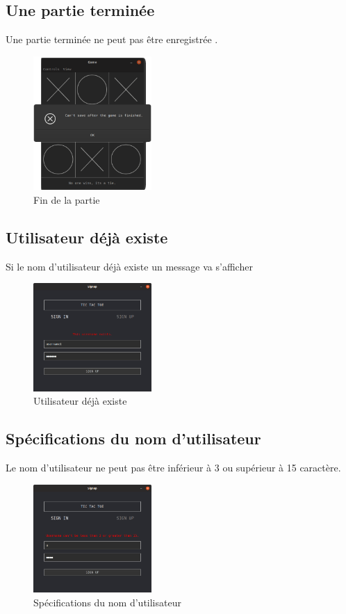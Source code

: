 \subsection{Une partie terminée }
Une partie terminée ne peut pas être enregistrée .

\begin{figure}[H]
	\centering
	\includegraphics[width=0.4\textwidth]{cannot save if game ended.PNG}
	  \caption{Fin de la partie}
	\label{fig:Fin de la partie}
\end{figure}
\clearpage
\subsection{Utilisateur déjà existe  }
Si le nom d’utilisateur déjà existe un message va s’afficher

\begin{figure}[H]
	\centering
	\includegraphics[width=0.4\textwidth]{user already exist.PNG}
	  \caption{Utilisateur déjà existe}
	\label{fig:Utilisateur déjà existe}
\end{figure}

\subsection{Spécifications du nom d’utilisateur }
Le nom d’utilisateur  ne peut pas être inférieur à 3 ou supérieur à 15 caractère.

\begin{figure}[H]
	\centering
	\includegraphics[width=0.4\textwidth]{username limitation.PNG}
	  \caption{Spécifications du nom d’utilisateur}
	\label{fig:Spécifications du nom d’utilisateur}
\end{figure}
\clearpage
